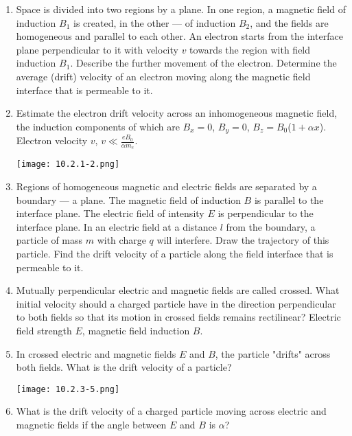 \documentclass{article}
\begin{document}
\begin{enumerate}[label=10.2.\arabic*]

\item Space is divided into two regions by a plane. In one region, a magnetic field of induction $B_1$ is created, in the other — of induction $B_2$, and the fields are homogeneous and parallel to each other. An electron starts from the interface plane perpendicular to it with velocity $v$ towards the region with field induction $B_1$. Describe the further movement of the electron. Determine the average (drift) velocity of an electron moving along the magnetic field interface that is permeable to it.


\item Estimate the electron drift velocity across an inhomogeneous magnetic field, the induction components of which are $B_x = 0$, $B_y = 0$, $B_z = B_0$($1 + \alpha x$). Electron velocity $v$, $v \ll \frac{e B_0}{\alpha m_e}$.

\begin{center}
    \texttt{[image: 10.2.1-2.png]}
\end{center}


\item Regions of homogeneous magnetic and electric fields are separated by a boundary — a plane. The magnetic field of induction $B$ is parallel to the interface plane. The electric field of intensity $E$ is perpendicular to the interface plane. In an electric field at a distance $l$ from the boundary, a particle of mass $m$ with charge $q$ will interfere. Draw the trajectory of this particle. Find the drift velocity of a particle along the field interface that is permeable to it.

\item Mutually perpendicular electric and magnetic fields are called crossed. What initial velocity should a charged particle have in the direction perpendicular to both fields so that its motion in crossed fields remains rectilinear? Electric field strength $E$, magnetic field induction $B$.

\item In crossed electric and magnetic fields $E$ and $B$, the particle "drifts" across both fields. What is the drift velocity of a particle?

\begin{center}
    \texttt{[image: 10.2.3-5.png]}
\end{center}


\item What is the drift velocity of a charged particle moving across electric and magnetic fields if the angle between $E$ and $B$ is $\alpha$?


\end{enumerate}
\end{document}
